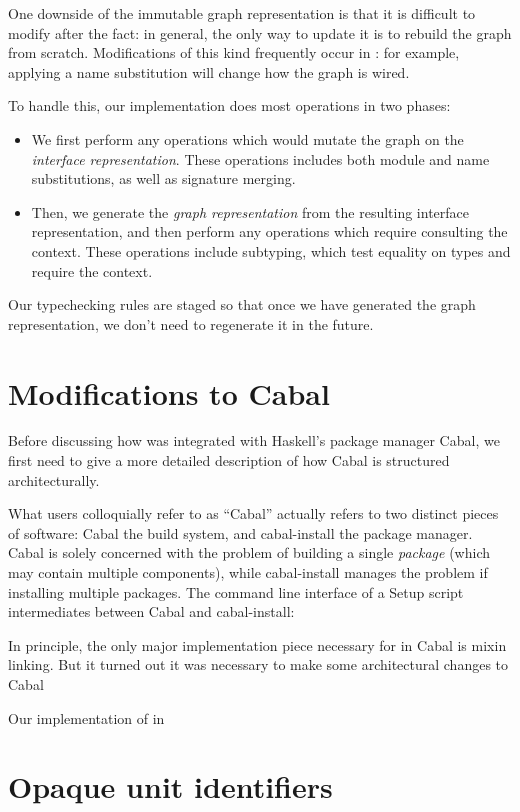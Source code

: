 One downside of the immutable graph representation is that it is
difficult to modify after the fact: in general, the only way to update
it is to rebuild the graph from scratch.  Modifications of this kind
frequently occur in \Backpack{}: for example, applying a name
substitution will change how the graph is wired.

To handle this, our implementation does most operations in two
phases:

\begin{itemize}
    \item We first perform any operations which would
    mutate the graph on the \emph{interface representation}.
    These operations includes both module and name substitutions, as well
    as signature merging.
    \item Then, we generate the \emph{graph representation} from
    the resulting interface representation, and then perform any
    operations which require consulting the context.  These
    operations include subtyping, which test equality on types
    and require the context.
\end{itemize}
%
Our typechecking rules are staged so that once we have generated the
graph representation, we don't need to regenerate it in the future.

\section{Modifications to Cabal}

Before discussing how \Backpack{} was integrated with Haskell's
package manager Cabal, we first need to give a more detailed description
of how Cabal is structured architecturally.

What users colloquially refer to as ``Cabal'' actually refers to two
distinct pieces of software: Cabal the build system, and cabal-install
the package manager.  Cabal is solely concerned with the problem of building
a single \emph{package} (which may contain multiple components), while
cabal-install manages the problem if installing multiple packages.  The
command line interface of a Setup script intermediates between
Cabal and cabal-install:

In principle, the only major implementation piece necessary for \Backpack{}
in Cabal is mixin linking.  But it turned out it was necessary to
make some architectural changes to Cabal

Our implementation of \Backpack{} in

\section{Opaque unit identifiers}
\label{sec:opaque-uid}


